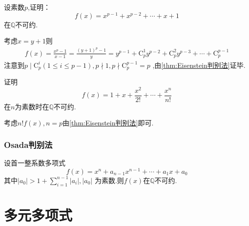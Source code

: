 \begin{brown}
\begin{example}
    设素数$p$,证明：
    \[
    f\left(x\right)=x^{p-1}+x^{p-2}+\cdots+x+1
    \]
    在$\mathbb{Q}$不可约.
\end{example}
\begin{Proof}
考虑$x=y+1$则\begin{align*}
    f\left(x\right)=\frac{x^p-1}{x-1}=\frac{\left(y+1\right)^p-1}{y}=
    y^{p-1}+\mathrm{C}_p^1y^{p-2}+\mathrm{C}_p^2y^{p-3}+\cdots+\mathrm{C}_p^{p-1}
\end{align*}
注意到$p\mid \mathrm{C}_p^i\left(1\leqslant i\leqslant p-1\right),p\nmid 1,p\nmid \mathrm{C}_p^{p-1}=p$
,由\cref{thm:Eisenstein判别法}证毕.
\end{Proof}
\end{brown}
\begin{brown}
\begin{example}
    证明
    \[
    f\left(x\right)=1+x+\frac{x^2}{2!}+\cdots+\frac{x^n}{n!}
    \]
    在$n$为素数时在$\mathbb{Q}$不可约.
\end{example}
\begin{Proof}
考虑$n!f\left(x\right),n=p$由\cref{thm:Eisenstein判别法}即可.
\end{Proof}
\end{brown}
\subsubsection{Osada判别法}
\begin{formal}
\begin{theorem}[Osada判别法]\label{thm:Osada判别法}
    设首一整系数多项式
    \[
    f\left(x\right)=x^n+a_{n-1}x^{n-1}+\cdots+a_1x+a_0
    \]
    其中$\displaystyle
    \left|a_0\right|>1+\sum_{i=1}^{n-1}\left|a_i\right|,\left|a_0\right|$
    为素数.则$f\left(x\right)$在$\mathbb{Q}$不可约.
\end{theorem}
\end{formal}
\section{多元多项式}
